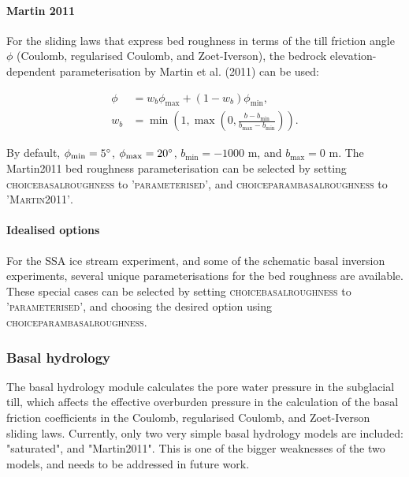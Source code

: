 \documentclass{article}
\begin{document}
\paragraph{Martin 2011}
For the sliding laws that express bed roughness in terms of the till friction angle $\phi$ (Coulomb, regularised Coulomb, and Zoet-Iverson), the bedrock elevation-dependent parameterisation by Martin et al. (2011) can be used:

\begin{align} \label{eq:slid_bedroughness_01}
\phi &= w_b \phi_{\textrm{max}} + \left( 1 - w_b \right) \phi_{\textrm{min}}, \\
w_b &= \min \left( 1, \max \left( 0, \frac{ b - b_{\textrm{min}} } { b_{\textrm{max}} - b_{\textrm{min}} } \right) \right).
\end{align}

By default, $\phi_{\textrm{min}} = 5 \degree$, $\phi_{\textrm{max}} = 20 \degree$, $b_{\textrm{min}} = -1000$ m, and $b_{\textrm{max}} = 0$ m. The Martin2011 bed roughness parameterisation can be selected by setting \textsc{choice\textunderscore basal\textunderscore roughness} to \textsc{'parameterised'}, and \textsc{choice\textunderscore param\textunderscore basal\textunderscore roughness} to \textsc{'Martin2011'}.

\paragraph{Idealised options}
For the SSA ice stream experiment, and some of the schematic basal inversion experiments, several unique parameterisations for the bed roughness are available. These special cases can be selected by setting \textsc{choice\textunderscore basal\textunderscore roughness} to \textsc{'parameterised'}, and choosing the desired option using \textsc{choice\textunderscore param\textunderscore basal\textunderscore roughness}.

\subsubsection{Basal hydrology}

The basal hydrology module calculates the pore water pressure in the subglacial till, which affects the effective overburden pressure in the calculation of the basal friction coefficients in the Coulomb, regularised Coulomb, and Zoet-Iverson sliding laws. Currently, only two very simple basal hydrology models are included: "saturated", and "Martin2011". This is one of the bigger weaknesses of the two models, and needs to be addressed in future work.
\end{document}
